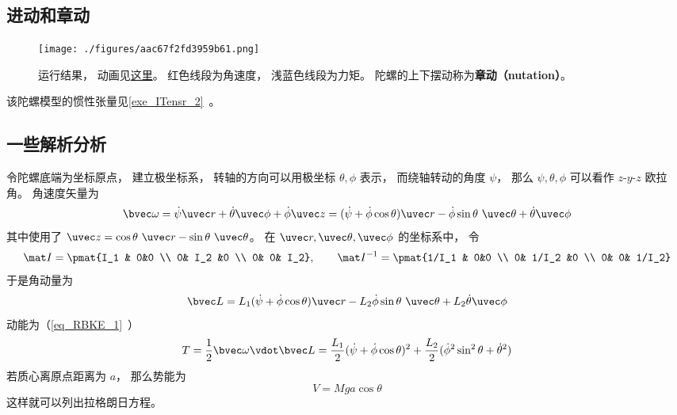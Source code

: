 
\begin{issues}
\issueDraft
\end{issues}


\subsection{进动和章动}

\begin{figure}[ht]
\centering
\texttt{[image: ./figures/aac67f2fd3959b61.png]}
\caption{运行结果， 动画见\href{https://wuli.wiki/apps/Top.html}{这里}。 红色线段为角速度， 浅蓝色线段为力矩。 陀螺的上下摆动称为\textbf{章动（nutation）}。} \label{fig_TopNum_1}
\end{figure}

该陀螺模型的惯性张量见\autoref{exe_ITensr_2}~。

\subsection{一些解析分析}
令陀螺底端为坐标原点， 建立极坐标系， 转轴的方向可以用极坐标 $\theta, \phi$ 表示， 而绕轴转动的角度 $\psi$， 那么 $\psi, \theta, \phi$ 可以看作 $z$-$y$-$z$ 欧拉角。 角速度矢量为
\begin{equation}
\bvec\omega
= \dot\psi\uvec r + \dot\theta\uvec\phi + \dot\phi\uvec z
= (\dot\psi + \dot\phi\cos\theta)\uvec r - \dot\phi\sin\theta\ \uvec\theta +
 \dot\theta\uvec\phi
\end{equation}
其中使用了 $\uvec z = \cos\theta\ \uvec r - \sin\theta\ \uvec\theta$。 在 $\uvec r, \uvec\theta, \uvec \phi$ 的坐标系中， 令
\begin{equation}
\mat I = \pmat{I_1 & 0&0 \\ 0& I_2 &0 \\ 0& 0& I_2}, \qquad
\mat I^{-1} = \pmat{1/I_1 & 0&0 \\ 0& 1/I_2 &0 \\ 0& 0& 1/I_2}
\end{equation}
于是角动量为
\begin{equation}
\bvec L = L_1(\dot\psi + \dot\phi\cos\theta)\uvec r - L_2\dot\phi\sin\theta\ \uvec\theta + L_2\dot\theta\uvec\phi
\end{equation}
动能为（\autoref{eq_RBKE_1}~）
\begin{equation}
T = \frac{1}{2}\bvec\omega\vdot\bvec L = \frac{L_1}{2}(\dot\psi + \dot\phi\cos\theta)^2 + \frac{L_2}{2}(\dot\phi^2\sin^2\theta + \dot\theta^2)
\end{equation}
若质心离原点距离为 $a$， 那么势能为
\begin{equation}
V = Mga\cos\theta
\end{equation}
这样就可以列出拉格朗日方程。

